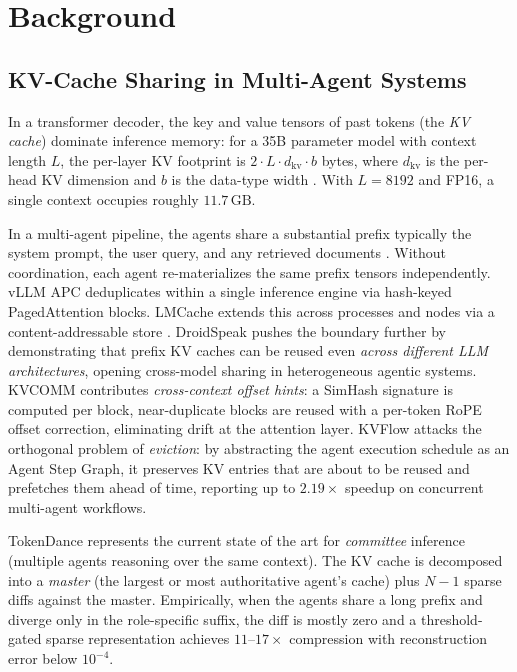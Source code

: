 \documentclass[10pt,twocolumn]{article}
\begin{document}
\section{Background}
\label{sec:background}

\subsection{KV-Cache Sharing in Multi-Agent Systems}
\label{sec:bg:kvshare}

In a transformer decoder, the key and value tensors of past tokens (the
\emph{KV cache}) dominate inference memory: for a 35B parameter model with
context length $L$, the per-layer KV footprint is
$2 \cdot L \cdot d_{\mathrm{kv}} \cdot b$ bytes, where $d_{\mathrm{kv}}$ is
the per-head KV dimension and $b$ is the data-type width
\cite{vllm,rotatekv}. With $L = 8192$ and FP16, a single context occupies
roughly $11.7\,\mathrm{GB}$.

In a multi-agent pipeline, the agents share a substantial prefix\textemdash
typically the system prompt, the user query, and any retrieved documents
\cite{kvcomm}. Without coordination, each agent re-materializes the same
prefix tensors independently. vLLM APC deduplicates within a single
inference engine via hash-keyed PagedAttention blocks. LMCache extends this
across processes and nodes via a content-addressable store
\cite{lmcache}. DroidSpeak \cite{droidspeak} pushes the boundary further by
demonstrating that prefix KV caches can be reused even \emph{across
different LLM architectures}, opening cross-model sharing in heterogeneous
agentic systems. KVCOMM \cite{kvcomm} contributes \emph{cross-context
offset hints}: a SimHash signature is computed per block, near-duplicate
blocks are reused with a per-token RoPE offset correction, eliminating
drift at the attention layer. KVFlow \cite{kvflow} attacks the orthogonal
problem of \emph{eviction}: by abstracting the agent execution schedule as
an Agent Step Graph, it preserves KV entries that are about to be reused
and prefetches them ahead of time, reporting up to $2.19\times$ speedup on
concurrent multi-agent workflows.

TokenDance \cite{tokendance} represents the current state of the art for
\emph{committee} inference (multiple agents reasoning over the same
context). The KV cache is decomposed into a \emph{master} (the largest or
most authoritative agent's cache) plus $N-1$ sparse diffs against the
master. Empirically, when the agents share a long prefix and diverge only
in the role-specific suffix, the diff is mostly zero and a threshold-gated
sparse representation achieves $11$--$17\times$ compression with
reconstruction error below $10^{-4}$.
\end{document}
